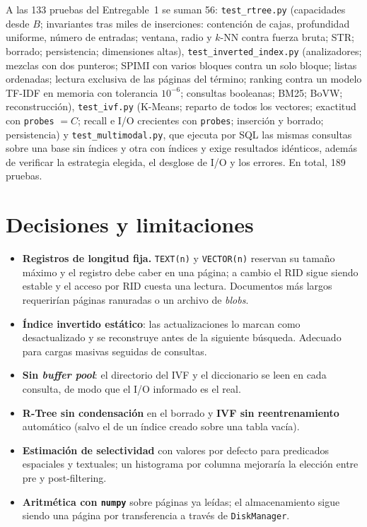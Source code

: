 \documentclass[11pt,a4paper]{article}
\newcommand{\code}[1]{\texttt{#1}}
\begin{document}
A las 133 pruebas del Entregable~1 se suman 56: \code{test\_rtree.py} (capacidades desde $B$;
invariantes tras miles de inserciones: contención de cajas, profundidad uniforme, número de entradas;
ventana, radio y $k$-NN contra fuerza bruta; STR; borrado; persistencia; dimensiones altas),
\code{test\_inverted\_index.py} (analizadores; mezclas con dos punteros; SPIMI con varios bloques
contra un solo bloque; listas ordenadas; lectura exclusiva de las páginas del término; ranking contra
un modelo TF-IDF en memoria con tolerancia $10^{-6}$; consultas booleanas; BM25; BoVW;
reconstrucción), \code{test\_ivf.py} (K-Means; reparto de todos los vectores; exactitud con
\code{probes} $=C$; recall e I/O crecientes con \code{probes}; inserción y borrado; persistencia) y
\code{test\_multimodal.py}, que ejecuta por SQL las mismas consultas sobre una base sin índices y
otra con índices y exige resultados idénticos, además de verificar la estrategia elegida, el
desglose de I/O y los errores. En total, 189 pruebas.

\section{Decisiones y limitaciones}

\begin{itemize}
\item \textbf{Registros de longitud fija.} \code{TEXT(n)} y \code{VECTOR(n)} reservan su tamaño
  máximo y el registro debe caber en una página; a cambio el RID sigue siendo estable y el acceso por
  RID cuesta una lectura. Documentos más largos requerirían páginas ranuradas o un archivo de
  \emph{blobs}.
\item \textbf{Índice invertido estático}: las actualizaciones lo marcan como desactualizado y se
  reconstruye antes de la siguiente búsqueda. Adecuado para cargas masivas seguidas de consultas.
\item \textbf{Sin \emph{buffer pool}}: el directorio del IVF y el diccionario se leen en cada
  consulta, de modo que el I/O informado es el real.
\item \textbf{R-Tree sin condensación} en el borrado y \textbf{IVF sin reentrenamiento} automático
  (salvo el de un índice creado sobre una tabla vacía).
\item \textbf{Estimación de selectividad} con valores por defecto para predicados espaciales y
  textuales; un histograma por columna mejoraría la elección entre pre y post-filtering.
\item \textbf{Aritmética con \code{numpy}} sobre páginas ya leídas; el almacenamiento sigue siendo
  una página por transferencia a través de \code{DiskManager}.
\end{itemize}
\end{document}
